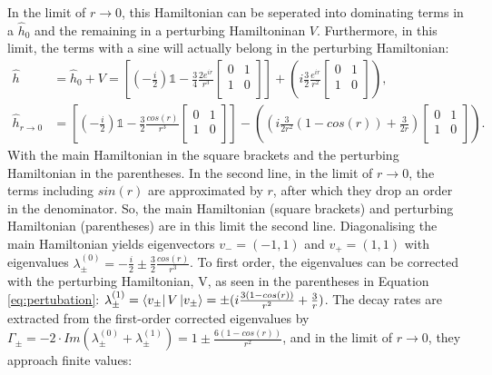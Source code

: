 \documentclass{article}
\begin{document}
In the limit of $r\rightarrow 0$, this Hamiltonian can be seperated into dominating terms in a $\hat{h}_0$ and the remaining in a perturbing Hamiltoninan $V$. Furthermore, in this limit, the terms with a sine will actually belong in the perturbing Hamiltonian:
\begin{equation}\label{eq:pertubation}
    \begin{split}
        \hat{h} &= \hat{h}_0 + V = \left[ \left(- \frac{i}{2} \right) \mathds{1} - \frac{3}{4} \frac{2e^{ir}}{r^3} \begin{bmatrix} 0 & 1 \\ 1 & 0 \\ \end{bmatrix} \right] + \left(i \frac{3}{2} \frac{e^{ir}}{r^2} \begin{bmatrix} 0 & 1 \\ 1 & 0 \\ \end{bmatrix}\right), \\
        \hat{h}_{r\rightarrow 0} &= \left[ \left(- \frac{i}{2} \right) \mathds{1} - \frac{3}{2} \frac{cos(r)}{r^3} \begin{bmatrix} 0 & 1 \\ 1 & 0 \\ \end{bmatrix} \right] - \left(\left( i \frac{3}{2r^2} \left(1 - cos(r)\right) + \frac{3}{2r} \right) \begin{bmatrix} 0 & 1 \\ 1 & 0 \\ \end{bmatrix}\right).
    \end{split}
\end{equation}
With the main Hamiltonian in the square brackets and the perturbing Hamiltonian in the parentheses. In the second line, in the limit of $r\rightarrow 0$, the terms including $sin(r)$ are approximated by $r$, after which they drop an order in the denominator. So, the main Hamiltonian (square brackets) and perturbing Hamiltonian (parentheses) are in this limit the second line. Diagonalising the main Hamiltonian yields eigenvectors $v_- = (-1, 1)$ and $v_+ = (1, 1)$ with eigenvalues $\lambda^{(0)}_\pm = -\frac{i}{2} \pm \frac{3}{2} \frac{cos(r)}{r^3}$. To first order, the eigenvalues can be corrected with the perturbing Hamiltonian, V, as seen in the parentheses in Equation \ref{eq:pertubation}: $\lambda^{(1)}_\pm=\bra{v_{\pm}} V \ket{v_{\pm}} = \pm (i \frac{3(1-cos(r))}{r^2} + \frac{3}{r})$. The decay rates are extracted from the first-order corrected eigenvalues by $\Gamma_\pm = -2 \cdot Im(\lambda^{(0)}_\pm + \lambda^{(1)}_\pm) = 1 \pm \frac{6(1-cos(r))}{r^2}$, and in the limit of $r\rightarrow 0$, they approach finite values:
\end{document}
